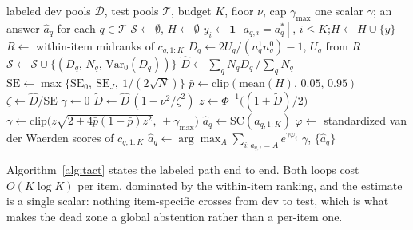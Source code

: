 \documentclass{article}
\newcommand{\Dhat}{\widehat{D}}
\newcommand{\TACT}{\textsc{tact}}
\begin{document}
\begin{algorithm}[t]
\caption{\TACT{}: derive the exponent, then vote}
\label{alg:tact}
\begin{algorithmic}[1]
\Require labeled dev pools $\mathcal{D}$, test pools $\mathcal{T}$, budget $K$,
floor $\nu$, cap $\gamma_{\max}$
\Ensure one scalar $\gamma$; an answer $\hat a_q$ for each $q\in\mathcal{T}$
\State $\mathcal{S}\gets\emptyset$,\; $H\gets\emptyset$
  \State $y_i\gets\mathbf{1}[a_{q,i}=a^\ast_q]$,\; $i\le K$;\quad $H\gets H\cup\{y\}$
   
    \State $R\gets$ within-item midranks of $c_{q,1:K}$
    \State $D_q\gets 2U_q/(n^1_qn^0_q)-1$, \; $U_q$ from $R$
    \State $\mathcal{S}\gets\mathcal{S}\cup\{(D_q,\,N_q,\,\mathrm{Var}_0(D_q))\}$
  \EndIf
\EndFor
\State $\Dhat\gets\sum_q N_qD_q\,/\sum_q N_q$ 
\State $\mathrm{SE}\gets\max\{\mathrm{SE}_0,\ \mathrm{SE}_J,\ 1/(2\sqrt{N})\}$
\State $\bar p\gets\mathrm{clip}(\mathrm{mean}(H),\,0.05,\,0.95)$
\State $\zeta\gets\Dhat/\mathrm{SE}$
\If{$|\zeta|\le\nu$} 
  \State $\gamma\gets 0$
\Else
  \State $\tilde D\gets\Dhat\,(1-\nu^2/\zeta^2)$ 
  \State $z\gets\Phi^{-1}\big((1+\tilde D)/2\big)$
  \State $\gamma\gets\mathrm{clip}\big(z\sqrt{2+4\bar p(1-\bar p)z^2},\,\pm\gamma_{\max}\big)$
\EndIf
{}
    \State $\hat a_q\gets\mathrm{SC}(a_{q,1:K})$ 
  \Else
    \State $\varphi\gets$ standardized van der Waerden scores of $c_{q,1:K}$
    \State $\hat a_q\gets\arg\max_A\sum_{i:a_{q,i}=A}e^{\gamma\varphi_i}$
  \EndIf
\EndFor
\State \Return $\gamma$, $\{\hat a_q\}$
\end{algorithmic}
\end{algorithm}

Algorithm~\ref{alg:tact} states the labeled path end to end. Both loops cost
$O(K\log K)$ per item, dominated by the within-item ranking, and the estimate
is a single scalar: nothing item-specific crosses from dev to test, which is
what makes the dead zone a global abstention rather than a per-item one.
\end{document}
